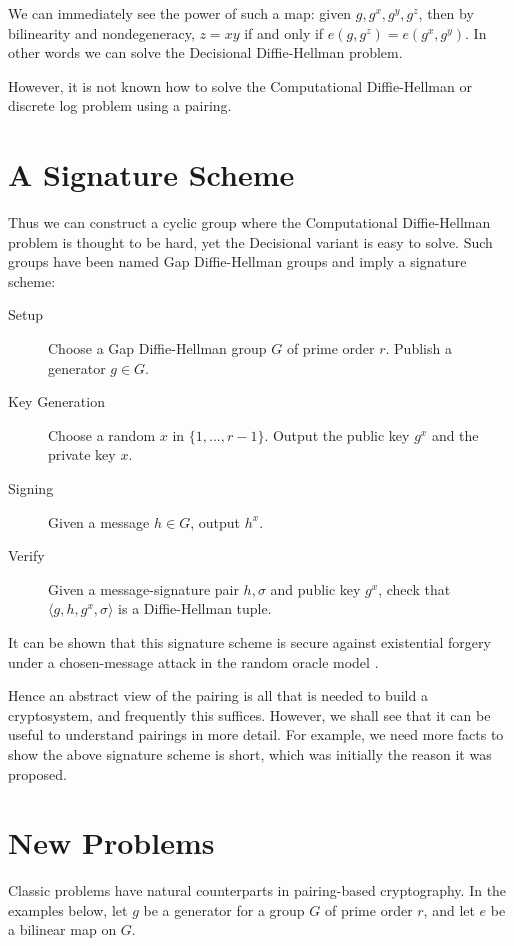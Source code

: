 We can immediately see the power of such a map: given
$g, g^x, g^y, g^z$, then by bilinearity and nondegeneracy,
$z = x y$ if and only if
$e(g, g^z) = e(g^x, g^y)$. In other words we can solve the Decisional
Diffie-Hellman problem.

However, it is not known how to solve the Computational Diffie-Hellman
or discrete log problem using a pairing.

\section{A Signature Scheme}

Thus we can construct a cyclic group where the Computational Diffie-Hellman
problem is thought to be hard, yet the Decisional variant is easy to solve.
Such groups have been named Gap Diffie-Hellman groups\cite{bls} and
imply a signature scheme:

\begin{description}
\item[Setup]
Choose a Gap Diffie-Hellman group $G$ of prime order $r$.
Publish a generator $g \in G$.

\item[Key Generation]
Choose a random $x$ in $\{1,...,r-1\}$. Output
the public key $g^x$ and the private key $x$.

\item[Signing]
Given a message $h \in G$, output $h^x$.

\item[Verify]
Given a message-signature pair $h, \sigma$ and public key $g^x$,
check that $\langle{ g, h, g^x, \sigma}\rangle$ is a Diffie-Hellman tuple.
\end{description}

It can be shown that this signature scheme is secure against existential
forgery under a chosen-message attack in the random oracle model \cite{bls}.

Hence an abstract view of the pairing is all that is needed to build a
cryptosystem, and frequently this suffices. However,
we shall see that it can be useful to understand pairings in more detail.
For example, we need more facts to show the above signature scheme is
short, which was initially the reason it was proposed.

\section{New Problems}

Classic problems have natural counterparts in pairing-based
cryptography. In the examples below, let $g$ be a generator
for a group $G$ of prime order $r$, and let $e$ be a bilinear map
on $G$.

